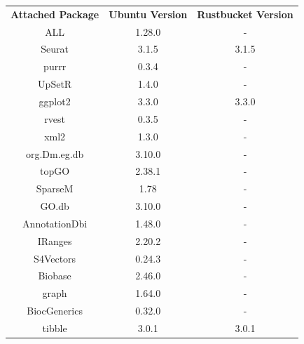 \documentclass[withindex,glossary]{cam-thesis}
\begin{document}
\begin{table}[htbp]
\centering
\begin{adjustbox}{width=.75\textwidth, center=\textwidth}
\begin{tabular}{ccc}
\rowcolor{thead}
{\color{headtext} \textbf{Attached Package}} & {\color{headtext} \textbf{Ubuntu Version}} & {\color{headtext} \textbf{Rustbucket Version}} \\
ALL                       & 1.28.0                  & -                           \\
Seurat                    & 3.1.5                   & 3.1.5                       \\
purrr                     & 0.3.4                   & -                           \\
UpSetR                    & 1.4.0                   & -                           \\
ggplot2                   & 3.3.0                   & 3.3.0                       \\
rvest                     & 0.3.5                   & -                           \\
xml2                      & 1.3.0                   & -                           \\
org.Dm.eg.db              & 3.10.0                  & -                           \\
topGO                     & 2.38.1                  & -                           \\
SparseM                   & 1.78                    & -                           \\
GO.db                     & 3.10.0                  & -                           \\
AnnotationDbi             & 1.48.0                  & -                           \\
IRanges                   & 2.20.2                  & -                           \\
S4Vectors                 & 0.24.3                  & -                           \\
Biobase                   & 2.46.0                  & -                           \\
graph                     & 1.64.0                  & -                           \\
BiocGenerics              & 0.32.0                  & -                           \\
tibble                    & 3.0.1                   & 3.0.1                       \\

\end{tabular}
\end{adjustbox}
\end{table}
\end{document}
